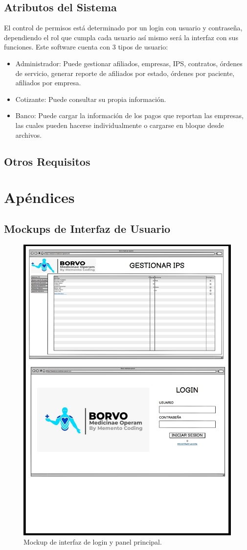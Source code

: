 \documentclass[12pt,a4paper]{article}
\begin{document}
\subsection{Atributos del Sistema}
El control de permisos está determinado por un login con usuario y contraseña, dependiendo el rol que cumpla cada usuario así mismo será la interfaz con sus funciones. Este software cuenta con 3 tipos de usuario:
\begin{itemize}
\item Administrador: Puede gestionar afiliados, empresas, IPS, contratos, órdenes de servicio, generar reporte de afiliados por estado, órdenes por paciente, afiliados por empresa.
\item Cotizante: Puede consultar su propia información.
\item Banco: Puede cargar la información de los pagos que reportan las empresas, las cuales pueden hacerse individualmente o cargarse en bloque desde archivos.
\end{itemize}
\subsection{Otros Requisitos}
\section{Apéndices}
\subsection{Mockups de Interfaz de Usuario}
\begin{figure}[H]
\centering
{\includegraphics[width=1 \textwidth]{Mockup.jpg} \par}
\caption{Mockup de interfaz de login y panel principal.}
\end{figure}
\end{document}
